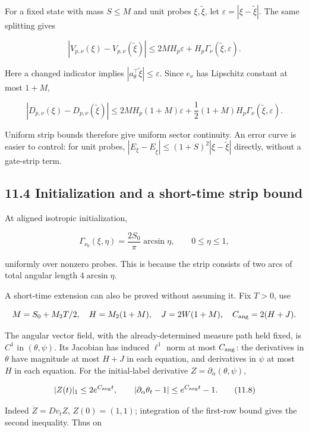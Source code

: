 \documentclass[
  10pt,
]{article}
\begin{document}
For a fixed state with mass \(S\le M\) and unit probes
\(\xi,\widetilde\xi\), let \(\varepsilon=|\xi-\widetilde\xi|\). The same
splitting gives

\[
 |V_{p,\nu}(\xi)-V_{p,\nu}(\widetilde\xi)|
 \le 2MH_p\varepsilon+H_p\Gamma_\nu(\widetilde\xi,\varepsilon).
 \tag{11.5}
\]

Here a changed indicator implies
\(|a_\theta^\top\widetilde\xi|\le\varepsilon\). Since \(e_\nu\) has
Lipschitz constant at most \(1+M\),

\[
 |D_{p,\nu}(\xi)-D_{p,\nu}(\widetilde\xi)|
 \le2MH_p(1+M)\varepsilon
 +\frac12(1+M)H_p\Gamma_\nu(\widetilde\xi,\varepsilon).
 \tag{11.6}
\]

Uniform strip bounds therefore give uniform sector continuity. An error
curve is easier to control: for unit probes,
\(|E_\xi-E_{\widetilde\xi}|\le(1+S)^2|\xi-\widetilde\xi|\) directly,
without a gate-strip term.

\subsection{11.4 Initialization and a short-time strip
bound}\label{initialization-and-a-short-time-strip-bound}

At aligned isotropic initialization,

\[
 \Gamma_{\nu_0}(\xi,\eta)
 =\frac{2S_0}{\pi}\arcsin\eta,\qquad0\le\eta\le1,
 \tag{11.7}
\]

uniformly over nonzero probes. This is because the strip consists of two
arcs of total angular length \(4\arcsin\eta\).

A short-time extension can also be proved without assuming it. Fix
\(T>0\), use

\[
 M=S_0+M_2T/2,\quad H=M_2(1+M),\quad J=2W(1+M),
 \quad C_{\rm ang}=2(H+J).
\]

The angular vector field, with the already-determined measure path held
fixed, is \(C^1\) in \((\theta,\psi)\). Its Jacobian has induced
\(\ell^1\) norm at most \(C_{\rm ang}\): the derivatives in \(\theta\)
have magnitude at most \(H+J\) in each equation, and derivatives in
\(\psi\) at most \(H\) in each equation. For the initial-label
derivative \(Z=\partial_\alpha(\theta,\psi)\),

\[
 |Z(t)|_1\le2e^{C_{\rm ang}t},\qquad
 |\partial_\alpha\theta_t-1|\le e^{C_{\rm ang}t}-1.
 \tag{11.8}
\]

Indeed \(\dot Z=Dv_t Z\), \(Z(0)=(1,1)\); integration of the first-row
bound gives the second inequality. Thus on
\end{document}
